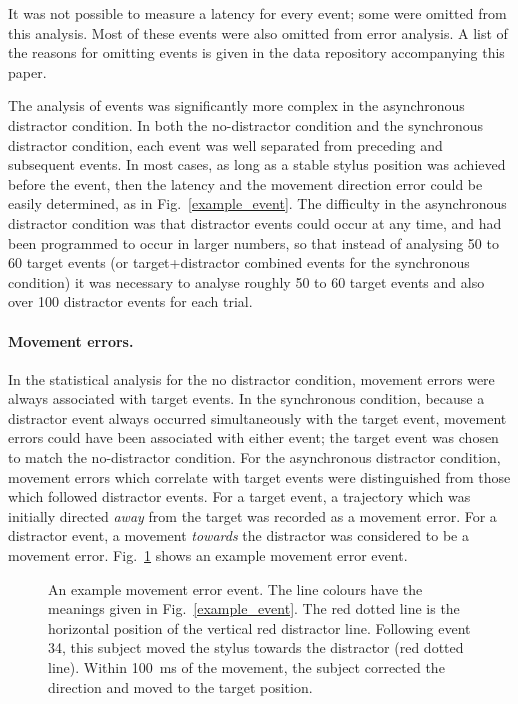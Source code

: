 \documentclass[10pt,letterpaper]{article}
\begin{document}
It was not possible to measure a latency for every event; some were
omitted from this analysis. Most of these events were also omitted
from error analysis.
A list of the reasons for omitting events is given in the data
repository accompanying this paper.


The analysis of events was significantly more complex in the
asynchronous distractor condition. In both the no-distractor condition
and the synchronous distractor condition, each event was well
separated from preceding and subsequent events. In most cases, as long
as a stable stylus position was achieved before the event, then the
latency and the movement direction error could be easily determined,
as in Fig.~\ref{example_event}. The difficulty in the asynchronous
distractor condition was that distractor events could occur at any
time, and had been programmed to occur in larger numbers, so that
instead of analysing 50 to 60 target events (or target+distractor
combined events for the synchronous condition) it was necessary to
analyse roughly 50 to 60 target events and also over 100 distractor
events for each trial.

\paragraph{Movement errors.} In the statistical analysis for the no
distractor condition, movement errors were always associated with
target events. In the synchronous condition, because a distractor
event always occurred simultaneously with the target event, movement
errors could have been associated with either event; the target event
was chosen to match the no-distractor condition. For the
asynchronous distractor condition, movement errors which correlate
with target events were distinguished from those which followed
distractor events. For a target event, a trajectory which was initially
directed \emph{away} from the target was recorded as a movement error. For a
distractor event, a movement \emph{towards} the distractor was considered to
be a movement error. Fig.~\ref{example_errorevent} shows an example movement
error event.

\begin{figure}[htb!]
\centering
\caption[Example error event] {An example movement error event. The
  line colours have the meanings given in
  Fig.~\ref{example_event}. The red dotted line is the horizontal
  position of the vertical red distractor line. Following event 34,
  this subject moved the stylus towards the distractor (red dotted
  line). Within 100~ms of the movement, the subject corrected the
  direction and moved to the target position.}
\label{example_errorevent}
\end{figure}
\end{document}
